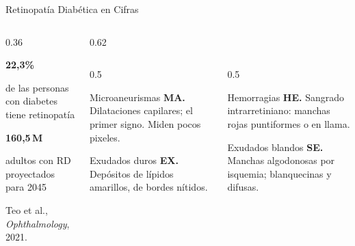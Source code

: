 \documentclass[aspectratio=169, 10pt]{beamer}
\newcommand{\cifra}[2]{%
	\begin{center}
		{\fontsize{30}{32}\selectfont\bfseries\color{UCMNavy}#1}\\[4pt]
		\parbox{0.95\linewidth}{\centering\small #2}
	\end{center}
}
\begin{document}
\begin{frame}{Retinopat\'ia Diab\'etica en Cifras}

	\begin{columns}[T]
		\begin{column}{0.36\textwidth}
			\cifra{22,3\%}{de las personas con diabetes tiene retinopat\'ia}
			\cifra{160,5\,M}{adultos con RD proyectados para 2045}
			{\scriptsize Teo et al., \textit{Ophthalmology}, 2021.}
		\end{column}

		\begin{column}{0.62\textwidth}
			\begin{columns}[T]
				\begin{column}{0.5\textwidth}
					\begin{block}{Microaneurismas}
						\scriptsize \textbf{MA.} Dilataciones capilares; el primer signo. Miden pocos pixeles.
					\end{block}
					\begin{block}{Exudados duros}
						\scriptsize \textbf{EX.} Dep\'ositos de l\'ipidos amarillos, de bordes n\'itidos.
					\end{block}
				\end{column}
				\begin{column}{0.5\textwidth}
					\begin{block}{Hemorragias}
						\scriptsize \textbf{HE.} Sangrado intrarretiniano: manchas rojas puntiformes o en llama.
					\end{block}
					\begin{block}{Exudados blandos}
						\scriptsize \textbf{SE.} Manchas algodonosas por isquemia; blanquecinas y difusas.
					\end{block}
				\end{column}
			\end{columns}
		\end{column}
	\end{columns}

\end{frame}
\end{document}
